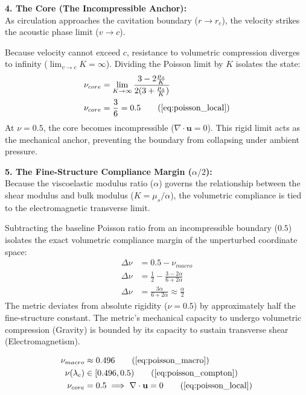 \textbf{4. The Core (The Incompressible Anchor):} \\
As circulation approaches the cavitation boundary ($r \to r_c$), the velocity strikes the acoustic phase limit ($v \to c$). 

Because velocity cannot exceed $c$, resistance to volumetric compression diverges to infinity ($\lim_{v \to c} K = \infty$). Dividing the Poisson limit by $K$ isolates the state: 
\begin{align}
    \nu_{core} &= \lim_{K \to \infty} \frac{3 - 2\frac{\mu_s}{K}}{2(3 + \frac{\mu_s}{K})} \nonumber \\
    \nu_{core} &= \frac{3}{6} = 0.5 \tag{\ref{eq:poisson_local}}
\end{align}
At $\nu = 0.5$, the core becomes incompressible ($\nabla \cdot \mathbf{u} = 0$). This rigid limit acts as the mechanical anchor, preventing the boundary from collapsing under ambient pressure.

\vspace{0.2 cm}

\textbf{5. The Fine-Structure Compliance Margin ($\alpha/2$):} \\
Because the viscoelastic modulus ratio ($\alpha$) governs the relationship between the shear modulus and bulk modulus ($K = \mu_s / \alpha$), the volumetric compliance is tied to the electromagnetic transverse limit. 

Subtracting the baseline Poisson ratio from an incompressible boundary ($0.5$) isolates the exact volumetric compliance margin of the unperturbed coordinate space:
\begin{align}
    \Delta \nu &= 0.5 - \nu_{macro} \nonumber \\
    \Delta \nu &= \frac{1}{2} - \frac{3 - 2\alpha}{6 + 2\alpha} \nonumber \\
    \Delta \nu &= \frac{3\alpha}{6 + 2\alpha} \approx \frac{\alpha}{2}
\end{align}
The metric deviates from absolute rigidity ($\nu=0.5$) by approximately half the fine-structure constant. The metric's mechanical capacity to undergo volumetric compression (Gravity) is bounded by its capacity to sustain transverse shear (Electromagnetism).

\begin{tcolorbox}[recallbox, title={\ref{box:rheological_gradient}. The Rheological Gradient}]
\begin{align}
    \nu_{macro} &\approx 0.496 \tag{\ref{eq:poisson_macro}} \\
    \nu(\lambda_c) &\in [0.496, 0.5) \tag{\ref{eq:poisson_compton}} \\
    \nu_{core} &= 0.5 \implies \nabla \cdot \mathbf{u} = 0 \tag{\ref{eq:poisson_local}}
\end{align}
\end{tcolorbox}








